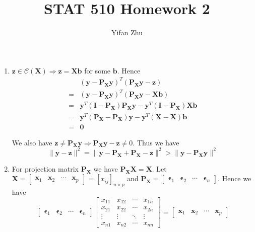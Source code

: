 \documentclass{article}
\begin{document}
	

	
	\title{STAT 510 Homework 2}
	\author{Yifan Zhu}
	\maketitle
	
	\begin{enumerate}[leftmargin = 0 em, label = \arabic*., font = \bfseries]
	\item 
	$\bm z \in \mathcal{C}(\bm X) \Rightarrow \bm z = \bm X \bm b$ for some $\bm b $. Hence
	\begin{align*}
	& (\bm y - \bm P_{\bm X} \bm y )^T (\bm P_{\bm X} \bm y - \bm z)\\
	= & (\bm y - \bm P_{\bm X} \bm y )^T (\bm P_{\bm X} \bm y - \bm X \bm b)\\
	= & \bm y^T (\bm I - \bm P_{\bm X})\bm P_{\bm X}\bm y - \bm y^T (\bm I - \bm P_{\bm X})\bm X \bm b\\
	=& \bm y^T (\bm P_{\bm X} - \bm P_{\bm X}) \bm y - \bm y^T (\bm X - \bm X)\bm b\\
	=& \bm 0
	\end{align*}

	We also have $\bm z \neq \bm P_{\bm X}\bm y \Rightarrow \bm P_{\bm X} \bm y - \bm z \neq 0$. Thus we have
	\[\|\bm y - \bm z\|^2 = \|\bm y - \bm P_{\bm X} + \bm P_{\bm X} - \bm z\|^2 > \| \bm y - \bm P_{\bm X} \bm y\|^2\]


	\item 
	For projection matrix $\bm P_{\bm X}$ we have $\bm P_{\bm X} \bm X = \bm X$. Let $\bm X = \begin{bmatrix}
		\bm x_1 & \bm x_2 & \cdots & \bm x_p
	\end{bmatrix} = [x_{ij}]_{n \times p}$ and $\bm P_{\bm X} = \begin{bmatrix}
		\bm \epsilon_{1} & \bm \epsilon_2 & \cdots & \bm \epsilon_{n}
	\end{bmatrix}$. Hence we have
	\[\begin{bmatrix}
		\bm \epsilon_{1} & \bm \epsilon_2 & \cdots & \bm \epsilon_{n}
	\end{bmatrix}  \begin{bmatrix}
		x_{11} & x_{12} & \cdots & x_{1n}\\
		x_{21} & x_{22} & \cdots & x_{2n} \\
		\vdots & \vdots & \ddots & \vdots \\
		x_{n1} & x_{n2} & \cdots & x_{nn}
	\end{bmatrix} = \begin{bmatrix}
		\bm x_1 & \bm x_2 & \cdots & \bm x_p
	\end{bmatrix}\]


\end{enumerate}
\end{document}
